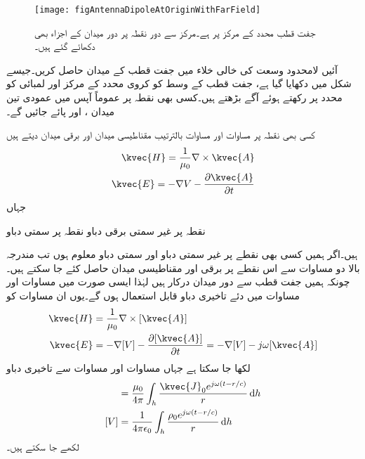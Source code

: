 \begin{figure}
\centering
\texttt{[image: figAntennaDipoleAtOriginWithFarField]}
\caption{جفت قطب محدد کے مرکز پر ہے۔مرکز سے دور نقطہ  پر دور میدان کے اجزاء بھی دکھائے گئے ہیں۔}
\label{شکل_اینٹینا_جفت_قطب_اور_اس_کے_دور_میدان}
\end{figure}

آئیں لامحدود وسعت کی خالی خلاء میں جفت قطب کے میدان حاصل کریں۔جیسے شکل  میں دکھایا گیا ہے، جفت قطب کے وسط کو کروی محدد کے مرکز اور لمبائی کو  محدد پر رکھتے ہوئے آگے بڑھتے ہیں۔کسی بھی نقطہ  پر عموماً آپس میں عمودی تین میدان ،  اور  پائے جائیں گے۔


کسی بھی نقطہ  پر مساوات   اور مساوات  بالترتیب مقناطیسی میدان اور برقی میدان دیتے ہیں
\begin{align}
\kvec{H}=\frac{1}{\mu_0}\nabla \times \kvec{A} \\
\kvec{E}=-\nabla V-\frac{\partial \kvec{A}}{\partial t}
\end{align}
جہاں
\begin{description}
 نقطہ  پر غیر سمتی برقی دباو
 نقطہ  پر سمتی دباو
\end{description}
ہیں۔اگر ہمیں کسی بھی نقطے پر غیر سمتی دباو  اور سمتی دباو  معلوم ہوں تب مندرجہ بالا دو مساوات سے اس نقطے پر برقی اور مقناطیسی میدان حاصل کئے جا سکتے ہیں۔چونکہ ہمیں  جفت قطب سے دور میدان درکار ہیں لہٰذا ایسی صورت میں مساوات  اور مساوات  میں دئے تاخیری دباو قابل استعمال ہوں گے۔یوں ان مساوات کو
\begin{align}
\kvec{H}&=\frac{1}{\mu_0}\nabla \times [\kvec{A}] \label{مساوات_اینٹینا_عمومی_مقناطیسی}\\
\kvec{E}&=-\nabla [V]-\frac{\partial [\kvec{A}]}{\partial t}=-\nabla [V]-j \omega [\kvec{A}]\label{مساوات_اینٹینا_عمومی_برقی}
\end{align}
لکھا جا سکتا ہے جہاں مساوات  اور مساوات  سے تاخیری دباو
\begin{align}
[\kvec{A}]&=\frac{\mu_0}{4\pi} \int_h \frac{\kvec{J}_0 e^{j \omega(t-r/c)}}{r} \dif h \label{مساوات_اینٹینا_عمومی_سمتی_دباو}\\
[V]&=\frac{1}{4\pi\epsilon_0}\int_h \frac{\rho_0 e^{j\omega(t-r/c)}}{r} \dif h\label{مساوات_اینٹینا_عمومی_غیر_سمتی_دباو}
\end{align}
لکھے جا سکتے ہیں۔

